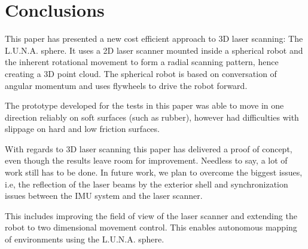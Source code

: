 \section{Conclusions}
\label{sec:conclusions}

This paper has presented a new cost efficient approach to 3D laser scanning: The L.U.N.A. sphere.
It uses a 2D laser scanner mounted inside a spherical robot and the inherent rotational movement to form a radial scanning pattern, hence creating a 3D point cloud.
The spherical robot is based on conversation of angular momentum and uses flywheels to drive the robot forward. 

The prototype developed for the tests in this paper was able to move in one direction reliably on soft surfaces (such as rubber), however had difficulties with slippage on hard and low friction surfaces.

With regards to 3D laser scanning this paper has delivered a proof of concept, even though the results leave room for improvement.
Needless to say, a lot of work still has to be done. 
In future work, we plan to overcome the biggest issues, i.e, the reflection of the laser beams by the exterior shell and synchronization issues between the IMU system and the laser scanner. 

This includes improving the field of view of the laser scanner and extending the robot to two dimensional movement control. This enables autonomous mapping of environments using the L.U.N.A. sphere. 